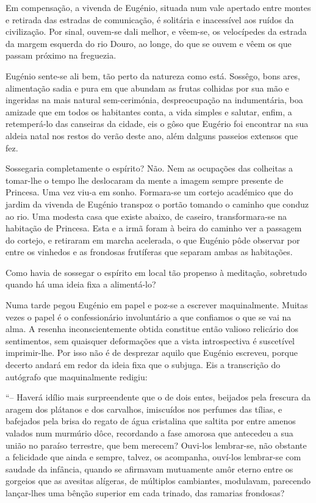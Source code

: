 \documentclass[9pt]{article}
\begin{document}
Em compensa\-ção, a vivenda de Eugé\-nio, situada num vale apertado entre
montes e retirada das estradas de comunica\-ção, é solitária e inacessível
aos ruídos da civiliza\-ção. Por sinal, ouvem-se dali me\-lhor, e vêem-se, os velocípedes da estrada da margem esquerda do rio Douro, ao longe, do que se
ouvem e vêem os que passam próximo na freguezia.

Eugé\-nio sente-se ali bem, tão perto da natureza como está. Sossêgo,
bons ares, alimenta\-ção sadia e pura em que abundam as frutas co\-lhidas por
sua mão e ingeridas na mais natural sem-cerimónia, despreocupa\-ção na indumentária, boa amizade que em todos os habitantes conta, a vida simples e
salutar, enfim, a retemperá-lo das canseiras da cidade, eis o gôso que Eugério foi encontrar na sua aldeia natal nos restos do verão deste ano, além
dalguns passeios extensos que fez.

Sossegaria completamente o espírito? Não. Nem as ocupa\-ções das co\-lheitas a tomar-\-lhe o tempo lhe deslocaram da mente a imagem sempre presente
de Princesa. Uma vez viu-a em sonho. Formara-se um cortejo académico que
do jardim da vivenda de Eugé\-nio transpoz o portão tomando o caminho que
conduz ao rio. Uma modesta casa que existe abaixo, de caseiro, transformara-se na habita\-ção de Princesa. Esta e a irmã foram à beira do caminho ver
a passagem do cortejo, e retiraram em marcha acelerada, o que Eugé\-nio pôde
observar por entre os vinhedos e as frondosas frutíferas que separam ambas as habita\-ções.

Como havia de sossegar o espírito em local tão propenso à medita\-ção,
sobretudo quan\-do há uma ideia fixa a alimentá-lo?

Numa tarde pegou Eugé\-nio em papel e poz-se a escrever maquinalmente.
Muitas vezes o papel é o confessionário involuntário a que confiamos o
que se vai na alma. A resenha inconscientemente obtida constitue então
valioso relicário dos sentimentos, sem quaisquer deforma\-ções que a
vista introspectiva é suscetível imprimir-\-lhe. Por isso não é de desprezar aquilo que Eugé\-nio escreveu, porque decerto andará em redor da ideia
fixa que o subjuga. Eis a transcri\-ção do autógrafo que maquinalmente redigiu:

``-- Haverá idílio mais surpreendente que o de dois entes, beijados
pela frescura da aragem dos plátanos e dos carva\-lhos, imiscuídos nos
perfumes das tílias, e bafejados pela brisa do regato de água cristalina que saltita por entre amenos valados num murmúrio dôce, recordando a fase amorosa que antecedeu a sua união no paraíso terrestre,
que bem merecem? Ouvi-los lembrar-se, não obstante a felicidade que
ainda e sempre, talvez, os acompanha, ouví-los lembrar-se com saudade
da infância, quan\-do se afirmavam mutuamente amôr eterno entre os gorgeios que as avesitas alígeras, de múltiplos cambiantes, modulavam, parecendo lan\-çar-\-lhes uma bên\-ção superior em cada trinado, das ramarias
frondosas?
\end{document}
